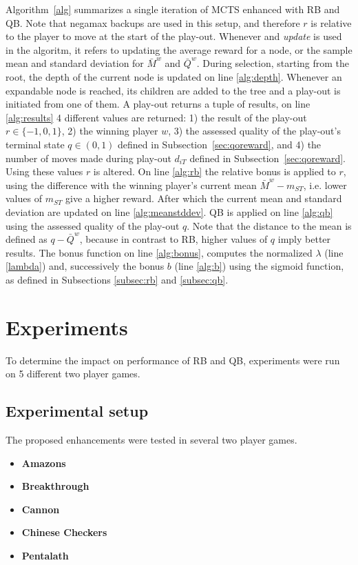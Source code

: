 \documentclass{ecai2010}
\begin{document}
Algorithm~\ref{alg} summarizes a single iteration of MCTS enhanced with RB and QB. Note that negamax backups are used in this setup, and therefore $r$ is relative to the player to move at the start of the play-out. Whenever and \emph{update} is used in the algoritm, it refers to updating the average reward for a node, or the sample mean and standard deviation for $\bar{M}^w$ and $\bar{Q}^w$. During selection, starting from the root, the depth of the current node is updated on line \ref{alg:depth}. Whenever an expandable node is reached, its children are added to the tree and a play-out is initiated from one of them. A play-out returns a tuple of results, on line \ref{alg:results} 4 different values are returned: 1) the result of the play-out $r \in \{-1, 0, 1\}$, 2) the winning player $w$, 3) the assessed quality of the play-out's terminal state $q \in (0,1)$ defined in Subsection~\ref{sec:qoreward}, and 4) the number of moves made during play-out $d_{iT}$ defined in Subsection~\ref{sec:qoreward}. Using these values $r$ is altered. On line \ref{alg:rb} the relative bonus is applied to $r$, using the difference with the winning player's current mean $\bar{M}^w - m_{ST}$, i.e. lower values of $m_{ST}$ give a higher reward. After which the current mean and standard deviation are updated on line \ref{alg:meanstddev}. QB is applied on line \ref{alg:qb} using the assessed quality of the play-out $q$. Note that the distance to the mean is defined as $q - \bar{Q}^w$, because in contrast to RB, higher values of $q$ imply better results. The {\sc bonus} function on line \ref{alg:bonus}, computes the normalized $\lambda$ (line \ref{lambda}) and, successively the bonus $b$ (line \ref{alg:b}) using the sigmoid function, as defined in Subsections \ref{subsec:rb} and \ref{subsec:qb}.

\section{Experiments}
To determine the impact on performance of RB and QB, experiments were run on 5 different two player games.

\subsection{Experimental setup}
\label{subsec:expsetup}
The proposed enhancements were tested in several two player games. 
\begin{itemize}
\item {\bf Amazons}
\item {\bf Breakthrough}
\item {\bf Cannon}
\item {\bf Chinese Checkers}
\item {\bf Pentalath}
\end{itemize}
\end{document}
